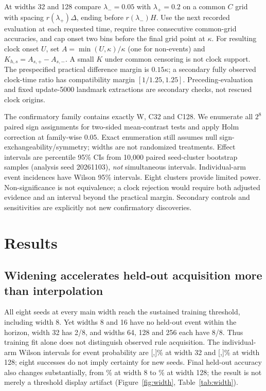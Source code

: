\documentclass{article}
\begin{document}
At widths 32 and 128 compare $\lambda_-=0.05$ with $\lambda_+=0.2$ on a common $C$ grid with spacing $r(\lambda_+)\Delta$, ending before $r(\lambda_-)H$. Use the next recorded evaluation at each requested time, require three consecutive common-grid accuracies, and cap onset two bins before the final grid point at $\kappa$. For resulting clock onset $U$, set $A=\min(U,\kappa)/\kappa$ (one for non-events) and $K_{h,s}=A_{s,+}-A_{s,-}$. A small $K$ under common censoring is not clock support. The prespecified practical difference margin is $0.15\kappa$; a secondary fully observed clock-time ratio has compatibility margin $[1/1.25,1.25]$. Preceding-evaluation and fixed update-5000 landmark extractions are secondary checks, not rescued clock origins.

The confirmatory family contains exactly W, C32 and C128. We enumerate all $2^8$ paired sign assignments for two-sided mean-contrast tests and apply Holm correction at family-wise $0.05$. Exact enumeration still assumes null sign-exchangeability/symmetry; widths are not randomized treatments. Effect intervals are percentile 95\% CIs from 10,000 paired seed-cluster bootstrap samples (analysis seed 20261103), \emph{not} simultaneous intervals. Individual-arm event incidences have Wilson 95\% intervals. Eight clusters provide limited power. Non-significance is not equivalence; a clock rejection would require both adjusted evidence and an interval beyond the practical margin. Secondary controls and sensitivities are explicitly not new confirmatory discoveries.

\section{Results}
\subsection{Widening accelerates held-out acquisition more than interpolation}
All eight seeds at every main width reach the sustained training threshold, including width 8. Yet widths 8 and 16 have no held-out event within the horizon, width 32 has 2/8, and widths 64, 128 and 256 each have 8/8. Thus training fit alone does not distinguish observed rule acquisition. The individual-arm Wilson intervals for event probability are [\MainSmallIncLo,\MainSmallIncHi]\% at width 32 and [\MainLargeIncLo,\MainLargeIncHi]\% at width 128; eight successes do not imply certainty for new seeds. Final held-out accuracy also changes substantially, from \MainTinyEval\% at width 8 to \MainLargeEval\% at width 128; the result is not merely a threshold display artifact (Figure~\ref{fig:width}, Table~\ref{tab:width}).
\end{document}

